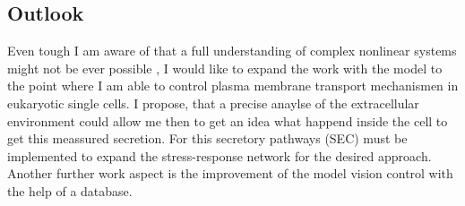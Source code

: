 \subsection{Outlook}
Even tough I am aware of that a full understanding of complex nonlinear systems might not be ever possible \cite{Noell2018}, 
I would like to expand the work with the model to the point where I am able to control plasma membrane transport mechanismen in eukaryotic single cells. I propose, that a precise anaylse of the extracellular environment could allow me then to get an idea what happend inside the cell to get this meassured secretion. For this secretory pathways (SEC) must be implemented to expand the stress-response network for the desired approach.\\
Another further work aspect is the improvement of the model vision control with the help of a database.\\\\

